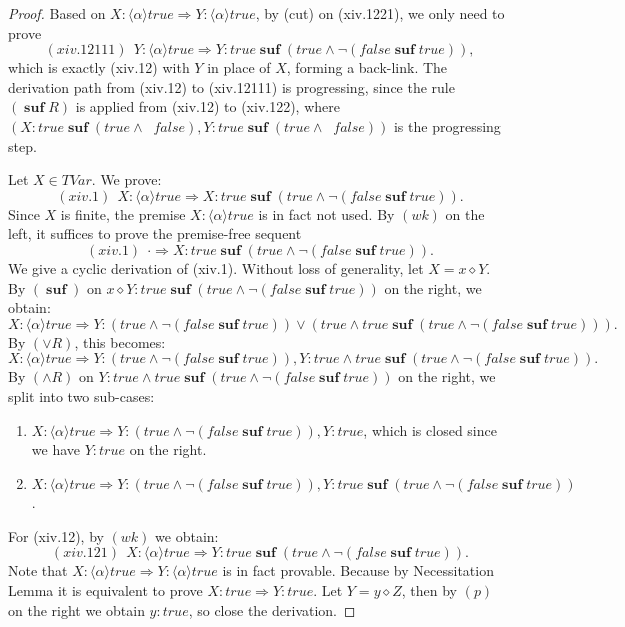 \documentclass[manuscript,screen]{acmart}
\newcommand{\la}[0]{\langle}
\newcommand{\ra}[0]{\rangle}
\newcommand{\true}[0]{\mathit{true}}
\newcommand{\false}[0]{\mathit{false}}
\newcommand{\cat}[0]{\diamond}
\DeclareMathOperator{\osuf}{\mathbf{suf}}
\newcommand{\TVar}[0]{\textit{TVar}}
\DeclareMathOperator{\nxt}{\mathbf{n}}
\DeclareMathOperator{\bnxt}{\bar{\nxt}}
\begin{document}
\begin{proof}
Based on $X : \la\alpha\ra\true\Rightarrow Y : \la\alpha\ra \true$, by (cut) on (xiv.1221), we only need to prove
$$
(xiv.12111)\ \ Y : \la\alpha\ra\true\Rightarrow Y : \true\osuf(\true\wedge\neg(\false\osuf\true)), 
$$
which is exactly (xiv.12) with $Y$ in place of $X$, forming a back-link. The derivation path from (xiv.12) to (xiv.12111) is progressing, since the rule $(\osuf R)$ is applied from (xiv.12) to (xiv.122), where $(X : \true\osuf(\true\wedge\bnxt\false), Y : \true\osuf(\true\wedge\bnxt\false))$ is the progressing step. 

\ifx
Let $X\in \TVar$. 
We prove:
$$
(xiv.1)\ \ X : \la\alpha\ra\true \Rightarrow X : \true\osuf(\true\wedge\neg(\false\osuf\true)).
$$
\ifx
Since $X$ is finite, 
the premise $X : \la\alpha\ra\true$ is in fact not used. 
By $(wk)$ on the left, it suffices to prove the premise-free sequent
$$
(xiv.1)\ \ \cdot\Rightarrow X : \true\osuf(\true\wedge\neg(\false\osuf\true)).
$$
We give a cyclic derivation of (xiv.1).
\fi
Without loss of generality, let $X = x\cat Y$. By $(\osuf)$ on $x\cat Y : \true\osuf(\true\wedge\neg(\false\osuf\true))$ on the right, we obtain:
$$
X : \la\alpha\ra\true\Rightarrow Y : (\true\wedge\neg(\false\osuf\true)) \vee (\true\wedge \true\osuf(\true\wedge\neg(\false\osuf\true))).
$$
By $(\vee R)$, this becomes:
$$
X : \la\alpha\ra\true\Rightarrow Y : (\true\wedge\neg(\false\osuf\true)), Y : \true\wedge \true\osuf(\true\wedge\neg(\false\osuf\true)).
$$
By $(\wedge R)$ on $Y : \true\wedge \true\osuf(\true\wedge\neg(\false\osuf\true))$ on the right, we split into two sub-cases:
\begin{enumerate}
    \item[(xiv.11)] $X : \la\alpha\ra\true\Rightarrow Y : (\true\wedge\neg(\false\osuf\true)), Y : \true$, which is closed since we have $Y : \true$ on the right.
    \item[(xiv.12)] $X : \la\alpha\ra\true\Rightarrow Y : (\true\wedge\neg(\false\osuf\true)), Y : \true\osuf(\true\wedge\neg(\false\osuf\true))$.
\end{enumerate}

For (xiv.12), by $(wk)$ we obtain:
$$
(xiv.121)\ \ X : \la\alpha\ra\true\Rightarrow Y : \true\osuf(\true\wedge\neg(\false\osuf\true)). 
$$
Note that $X : \la\alpha\ra\true\Rightarrow Y : \la\alpha\ra \true$ is in fact provable. 
Because by Necessitation Lemma it is equivalent to prove $X : \true\Rightarrow Y : \true$. Let $Y = y\cat Z$, then by $(p)$ on the right we obtain $y : \true$, so close the derivation. 


\end{proof}
\end{document}
